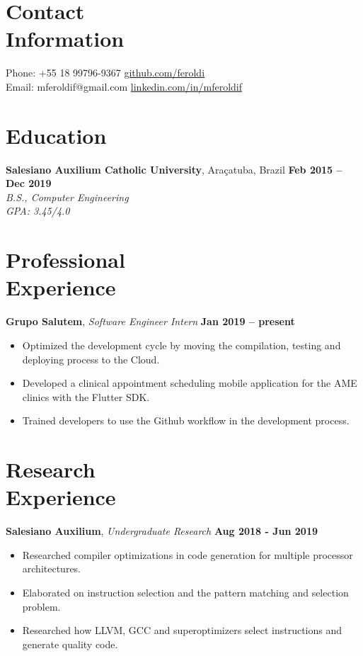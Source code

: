 \documentclass[margin,line]{resume}
\begin{document}
\begin{resume}
    \section{\mysidestyle Contact\\Information}

    Phone: +55 18 99796-9367 \hfill \url{github.com/feroldi}\\
    \noindent Email: mferoldif@gmail.com \hfill \url{linkedin.com/in/mferoldif}

    \section{\mysidestyle Education}

    \textbf{Salesiano Auxilium Catholic University}, Araçatuba, Brazil \hfill \textbf{Feb 2015 -- Dec 2019}\\
    \textsl{B.S., Computer Engineering}\\
    \textsl{GPA: 3.45/4.0}

    \section{\mysidestyle Professional\\Experience}

    \textbf{Grupo Salutem}, \textit{Software Engineer Intern} \hfill \textbf{Jan 2019 -- present}
    \begin{itemize}
        \item Optimized the development cycle by moving the compilation, testing and deploying process to the Cloud.
        \item Developed a clinical appointment scheduling mobile application for the AME clinics with the Flutter SDK.
        \item Trained developers to use the Github workflow in the development process.
    \end{itemize}

    \section{\mysidestyle Research\\Experience}

    \textbf{Salesiano Auxilium}, \textsl{Undergraduate Research} \hfill \textbf{Aug 2018 - Jun 2019}
    \begin{itemize}
        \item Researched compiler optimizations in code generation for multiple processor architectures.
        \item Elaborated on instruction selection and the pattern matching and selection problem.
        \item Researched how LLVM, GCC and superoptimizers select instructions and generate quality code.
    \end{itemize}


\end{resume}
\end{document}
